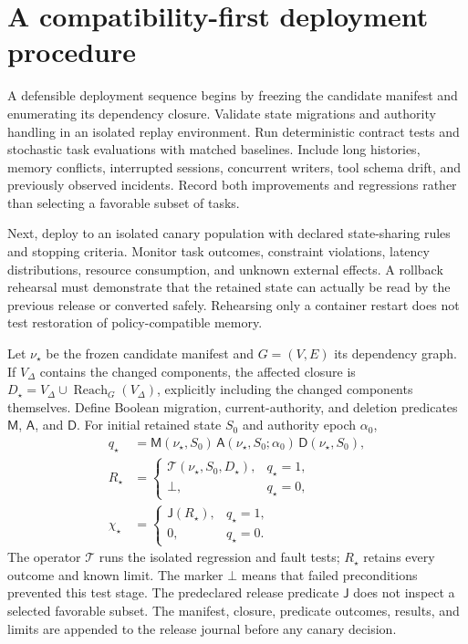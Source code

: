 \section{A compatibility-first deployment procedure}\label{sec:C32:07}
A defensible deployment sequence begins by freezing the candidate manifest and enumerating its dependency closure. Validate state migrations and authority handling in an isolated replay environment. Run deterministic contract tests and stochastic task evaluations with matched baselines. Include long histories, memory conflicts, interrupted sessions, concurrent writers, tool schema drift, and previously observed incidents. Record both improvements and regressions rather than selecting a favorable subset of tasks.

Next, deploy to an isolated canary population with declared state-sharing rules and stopping criteria. Monitor task outcomes, constraint violations, latency distributions, resource consumption, and unknown external effects. A rollback rehearsal must demonstrate that the retained state can actually be read by the previous release or converted safely. Rehearsing only a container restart does not test restoration of policy-compatible memory.

Let $\nu_\star$ be the frozen candidate manifest and $G=(V,E)$ its dependency graph. If $V_\Delta$ contains the changed components, the affected closure is $D_\star=V_\Delta\cup\operatorname{Reach}_G(V_\Delta)$, explicitly including the changed components themselves. Define Boolean migration, current-authority, and deletion predicates $\mathsf M$, $\mathsf A$, and $\mathsf D$. For initial retained state $S_0$ and authority epoch $\alpha_0$,
\begin{equation}
\label{eq:C32:release-preconditions}
\begin{aligned}
 q_\star&=\mathsf M(\nu_\star,S_0)\,
          \mathsf A(\nu_\star,S_0;\alpha_0)\,
          \mathsf D(\nu_\star,S_0),\\
 R_\star&=\begin{cases}
 \mathcal T(\nu_\star,S_0,D_\star),&q_\star=1,\\
 \bot,&q_\star=0,
 \end{cases}\\
 \chi_\star&=\begin{cases}
 \mathsf J(R_\star),&q_\star=1,\\
 0,&q_\star=0.
 \end{cases}
\end{aligned}
\end{equation}
The operator $\mathcal T$ runs the isolated regression and fault tests; $R_\star$ retains every outcome and known limit. The marker $\bot$ means that failed preconditions prevented this test stage. The predeclared release predicate $\mathsf J$ does not inspect a selected favorable subset. The manifest, closure, predicate outcomes, results, and limits are appended to the release journal before any canary decision.

